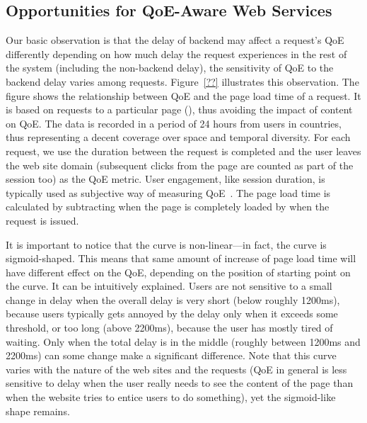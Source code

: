 \subsection{Opportunities for QoE-Aware Web Services}
\label{subsec:opportunities}
Our basic observation is that the delay of backend may affect a request's QoE differently depending on how much delay the request experiences in the rest of the system (including the non-backend delay), \ie the sensitivity of QoE to the backend delay varies among requests. 
Figure~\ref{??} illustrates this observation. 
The figure shows the relationship between QoE and the page load time of a request.
It is based on \fillme requests to a particular page (\fillme), thus avoiding the impact of content on QoE. 
The data is recorded in a period of 24 hours from users in \fillme countries, thus representing a decent coverage over space and temporal diversity.
For each request, we use the duration between the request is completed and the user leaves the web site domain (subsequent clicks from the page are counted as part of the session too) as the QoE metric. 
User engagement, like session duration, is typically used as subjective way of measuring QoE~\cite{engagement}.
The page load time is calculated by subtracting when the page is completely loaded by when the request is issued. 

It is important to notice that the curve is non-linear---in fact, the curve is sigmoid-shaped. 
This means that same amount of increase of page load time will have different effect on the QoE, depending on the position of starting point on the curve.
It can be intuitively explained. 
Users are not sensitive to a small change in delay when the overall delay is very short (below roughly 1200ms), because users typically gets annoyed by the delay only when it exceeds some threshold, or too long (above 2200ms), because the user has mostly tired of waiting. Only when the total delay is in the middle (roughly between 1200ms and 2200ms) can some change make a significant difference. 
Note that this curve varies with the nature of the web sites and the requests (\eg QoE in general is less sensitive to delay when the user really needs to see the content of the page than when the website tries to entice users to do something), yet the sigmoid-like shape remains.

